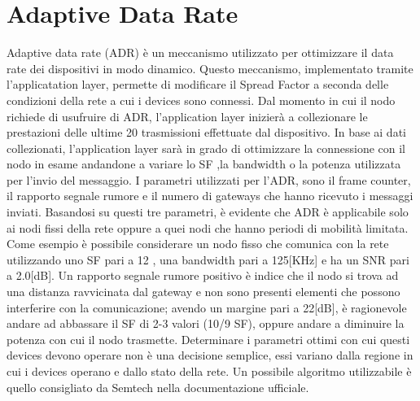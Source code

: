 \section{Adaptive Data Rate}
Adaptive data rate (ADR) è un meccanismo utilizzato per ottimizzare il data
rate dei dispositivi in modo dinamico. Questo meccanismo, implementato tramite
l'applicatation layer, permette di modificare il Spread Factor a seconda delle
condizioni della rete a cui i devices sono connessi. Dal momento in cui il nodo
richiede di usufruire di ADR, l'application layer inizierà a
collezionare le prestazioni delle ultime 20 trasmissioni effettuate dal
dispositivo.
In base ai dati collezionati, l'application layer sarà in grado di ottimizzare
la connessione con il nodo in esame andandone a variare lo SF ,la bandwidth o la
potenza utilizzata per l'invio del messaggio. I parametri utilizzati per l'ADR,
sono il frame counter, il
rapporto segnale rumore e il numero di gateways che hanno ricevuto i messaggi
inviati.  Basandosi su questi tre parametri, è evidente che ADR è applicabile
solo ai nodi fissi della rete oppure a quei nodi che hanno periodi di mobilità
limitata.  Come esempio è possibile considerare un nodo fisso che comunica con
la rete utilizzando uno SF pari a 12 , una bandwidth pari a 125[KHz] e ha un SNR
pari a 2.0[dB]. Un rapporto segnale rumore positivo è indice che il nodo si
trova ad una distanza ravvicinata dal gateway e non sono presenti elementi che
possono interferire con la comunicazione; avendo un margine pari a 22[dB], è
ragionevole andare ad abbassare il SF di 2-3 valori (10/9 SF), oppure andare a
diminuire la potenza con cui il nodo trasmette. Determinare i parametri ottimi
con cui questi devices devono operare non è una decisione semplice, essi
variano dalla regione in cui i devices operano e dallo stato della rete. Un possibile
algoritmo utilizzabile è quello consigliato da Semtech nella documentazione
ufficiale.

